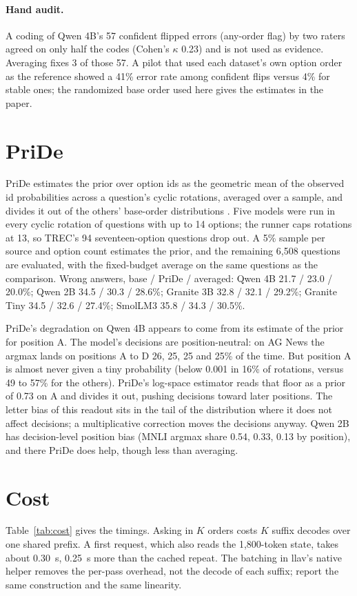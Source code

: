 \documentclass[10pt,twocolumn]{article}
\begin{document}
\paragraph{Hand audit.} A coding of Qwen 4B's 57 confident flipped errors (any-order flag) by two raters agreed on only half the codes (Cohen's $\kappa$ 0.23) and is not used as evidence. Averaging fixes 3 of those 57. A pilot that used each dataset's own option order as the reference showed a 41\% error rate among confident flips versus 4\% for stable ones; the randomized base order used here gives the estimates in the paper.

\section{PriDe}
\label{app:pride}
PriDe estimates the prior over option ids as the geometric mean of the observed id probabilities across a question's cyclic rotations, averaged over a sample, and divides it out of the others' base-order distributions \citep{zheng2024robust}. Five models were run in every cyclic rotation of questions with up to 14 options; the runner caps rotations at 13, so TREC's 94 seventeen-option questions drop out. A 5\% sample per source and option count estimates the prior, and the remaining 6,508 questions are evaluated, with the fixed-budget average on the same questions as the comparison. Wrong answers, base / PriDe / averaged: Qwen 4B 21.7 / 23.0 / 20.0\%; Qwen 2B 34.5 / 30.3 / 28.6\%; Granite 3B 32.8 / 32.1 / 29.2\%; Granite Tiny 34.5 / 32.6 / 27.4\%; SmolLM3 35.8 / 34.3 / 30.5\%.

PriDe's degradation on Qwen 4B appears to come from its estimate of the prior for position A. The model's decisions are position-neutral: on AG News the argmax lands on positions A to D 26, 25, 25 and 25\% of the time. But position A is almost never given a tiny probability (below 0.001 in 16\% of rotations, versus 49 to 57\% for the others). PriDe's log-space estimator reads that floor as a prior of 0.73 on A and divides it out, pushing decisions toward later positions. The letter bias of this readout sits in the tail of the distribution where it does not affect decisions; a multiplicative correction moves the decisions anyway. Qwen 2B has decision-level position bias (MNLI argmax share 0.54, 0.33, 0.13 by position), and there PriDe does help, though less than averaging.

\section{Cost}
\label{app:cost}
Table~\ref{tab:cost} gives the timings. Asking in $K$ orders costs $K$ suffix decodes over one shared prefix. A first request, which also reads the 1,800-token state, takes about 0.30~s, 0.25~s more than the cached repeat. The batching in llav's native helper removes the per-pass overhead, not the decode of each suffix; \citet{guda2025rethinking} report the same construction and the same linearity.
\end{document}
